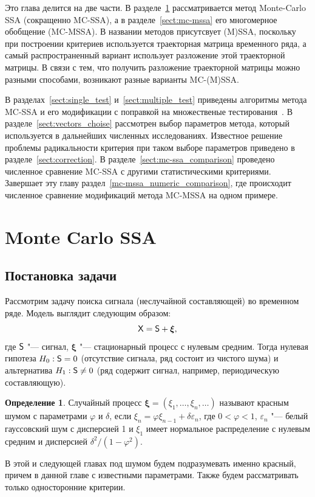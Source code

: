 \documentclass[specialist,
substylefile = spbu_report.rtx,
subf,href,colorlinks=true, 12pt]{disser}
\theoremstyle{definition}
\newtheorem{definition}{Определение}
\newcommand{\bfxi}{\boldsymbol{\xi}}
\begin{document}
Это глава делится на две части. В разделе~\ref{sect:mc-ssa} рассматривается метод Monte-Carlo SSA (сокращенно MC-SSA), а в разделе~\ref{sect:mc-mssa} его многомерное обобщение (MC-MSSA). В названии методов присутсвует (M)SSA, поскольку при построении критериев используется траекторная матрица временного ряда, а самый распространенный вариант использует разложение этой траекторной матрицы. В связи с тем, что получить разложение траекторной матрицы можно разными способами, возникают разные варианты MC-(M)SSA.

В разделах~\ref{sect:single_test} и~\ref{sect:multiple_test} приведены алгоритмы метода MC-SSA и его модификации с поправкой на множественые тестирования~\cite{Golyandina_2023}. В разделе~\ref{sect:vectors_choise} рассмотрен выбор параметров метода, который используется в дальнейших численных исследованиях. Известное решение проблемы радикальности критерия при таком выборе параметров приведено в разделе~\ref{sect:correction}. В разделе~\ref{sect:mc-ssa_comparison} проведено численное сравнение MC-SSA с другими статистическими критериями. Завершает эту главу раздел~\ref{mc-mssa_numeric_comparison}, где происходит численное сравнение модификаций метода MC-MSSA на одном примере.

\section{Monte Carlo SSA}\label{sect:mc-ssa}
\subsection{Постановка задачи}
Рассмотрим задачу поиска сигнала (неслучайной составляющей) во временном ряде. Модель выглядит следующим образом:
\[
\tX=\tS + \bfxi,
\]
где $\mathsf{S}$ "--- сигнал, $\bfxi$ "--- стационарный процесс с нулевым средним. Тогда нулевая гипотеза $H_0:\mathsf{S}=0$ (отсутствие сигнала, ряд состоит из чистого шума) и альтернатива $H_1:\mathsf{S}\ne0$ (ряд содержит сигнал, например, периодическую составляющую). 
\begin{definition}
	Случайный процесс $\bfxi=(\xi_1,\dots,\xi_n, \ldots)$ называют красным шумом с параметрами $\varphi$ и $\delta$, если $\xi_n = \varphi\xi_{n-1} + \delta\varepsilon_n$, где $0<\varphi<1$, $\varepsilon_n$ "--- белый гауссовский шум с дисперсией 1 и $\xi_1$ имеет нормальное распределение с нулевым средним и дисперсией $\delta^2/(1-\varphi^2)$.
\end{definition}
В этой и следующей главах под шумом будем подразумевать именно красный, причем в данной главе с известными параметрами.   Также будем рассматривать только односторонние критерии.
\end{document}
